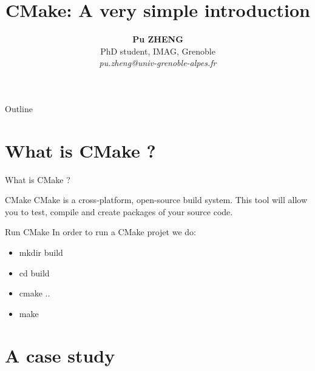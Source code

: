 \documentclass[10 pt]{beamer}
\title[CMake short tuto] %
{CMake: A very simple introduction}
\author[P. ZHENG] %
{ {\bf Pu ZHENG} \\ PhD student, IMAG, Grenoble \\ {\it pu.zheng@univ-grenoble-alpes.fr}}
\institute[IMAG] %
{IMAG}
\date[03/09/2019] %
{}
\begin{document}
\begin{frame}
  \titlepage
\end{frame}

\begin{frame}{Outline}
  \tableofcontents
\end{frame}

\section{What is CMake ?}

\begin{frame}{What is CMake ?}

\begin{block}{CMake}
			CMake is a cross-platform, open-source build system. This tool will allow you to test, compile and create packages of your source code.
\end{block}

\pause

\begin{exampleblock}{Run CMake}
	In order to run a CMake projet we do:
\begin{itemize}
		\item mkdir build
		\item  cd build
		\item cmake ..
		\item make 
\end{itemize}
\end{exampleblock}

\end{frame}

\section{A case study}
\end{document}
